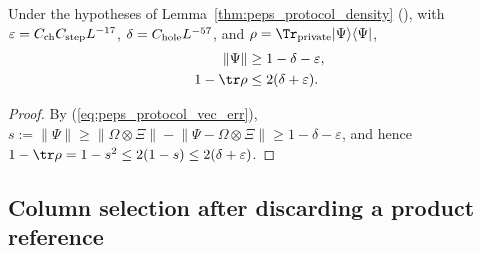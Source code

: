 \begin{lemma}
    \label{thm:peps_protocol_retained_norm}
    \leanok
    Under the hypotheses of Lemma~\ref{thm:peps_protocol_density} (\cite[Section~8.1]{OpenAI2026PolynomialPEPS}), with $\varepsilon = C_{\rm ch}C_{\rm step}L^{-17}$, $\delta = C_{\rm hole}L^{-57}$, and $\rho=\Tr_{\rm private}|\Psi\rangle\langle\Psi|$,
    \begin{align}
        \lVert\Psi\rVert & \geq 1-\delta-\varepsilon,  \\
        1-\tr\rho        & \leq 2(\delta+\varepsilon).
    \end{align}
\end{lemma}

\begin{proof}\leanok
    By (\ref{eq:peps_protocol_vec_err}), $s:=\lVert\Psi\rVert\ge\lVert\Omega\otimes\Xi\rVert-\lVert\Psi-\Omega\otimes\Xi\rVert\ge 1-\delta-\varepsilon$, and hence $1-\tr\rho=1-s^2\le 2(1-s)\le 2(\delta+\varepsilon)$.
\end{proof}

\subsection{Column selection after discarding a product reference}

